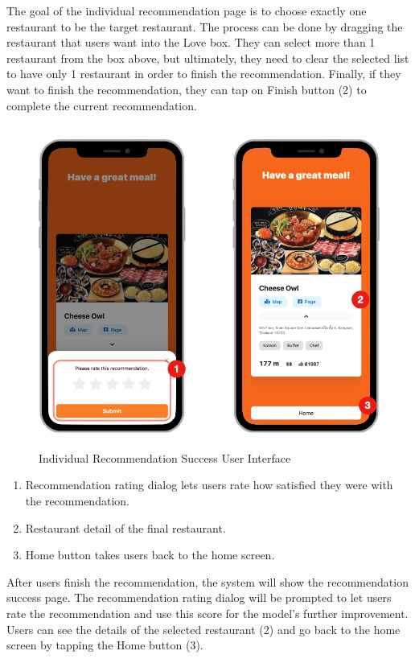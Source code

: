 \documentclass[12pt,oneside,openright,a4paper]{cpe-english-project}
\begin{document}
The goal of the individual recommendation page is to choose exactly one restaurant to be the target restaurant. The process can be done by dragging the restaurant that users want into the Love box. They can select more than 1 restaurant from the box above, but ultimately, they need to clear the selected list to have only 1 restaurant in order to finish the recommendation. Finally, if they want to finish the recommendation, they can tap on Finish button (2) to complete the current recommendation.
\begin{figure}[H]\centering
\includegraphics[height=300pt]{./images/4ui_IndividualRecommendationSuccessUserInterface.png}
\caption{Individual Recommendation Success User Interface}\label{fig:4ui_IndividualRecommendationSuccessUserInterface}
\end{figure}\vspace{-24pt}

\begin{enumerate}
\item Recommendation rating dialog lets users rate how satisfied they were with the recommendation.
\item Restaurant detail of the final restaurant.
\item Home button takes users back to the home screen.
\end{enumerate}

After users finish the recommendation, the system will show the recommendation success page. The recommendation rating dialog will be prompted to let users rate the recommendation and use this score for the model's further improvement. Users can see the details of the selected restaurant (2) and go back to the home screen by tapping the Home button (3).
\end{document}
